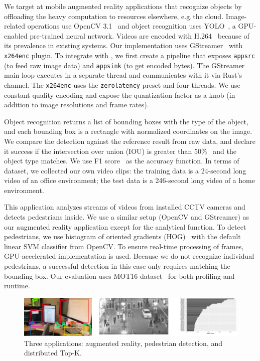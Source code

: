 \documentclass[twocolumn, 9pt]{article}
\begin{document}
 We target at mobile augmented reality applications
that recognize objects by offloading the heavy computation to resources
elsewhere, e.g.\,the cloud.  Image-related operations use OpenCV
3.1~\cite{opencvlibrary} and object recognition uses YOLO~\cite{darknet13,
  redmon2016yolo9000}, a GPU-enabled pre-trained neural network. Videos are
encoded with H.264~\cite{richardson2011h} because of its prevalence in existing
systems. Our implementation uses GStreamer~\cite{gstreamer} with
\texttt{x264enc} plugin. To integrate with \sysname{}, we first create a
pipeline that exposes \texttt{appsrc} (to feed raw image data) and
\texttt{appsink} (to get encoded bytes). The GStreamer main loop executes in a
separate thread and \sysname{} communicates with it via Rust's channel. The
\texttt{x264enc} uses the \texttt{zerolatency} preset and four threads. We use
constant quality encoding and expose the quantization factor as a knob (in
addition to image resolutions and frame rates).

Object recognition returns a list of bounding boxes with the type of the object,
and each bounding box is a rectangle with normalized coordinates on the
image. We compare the detection against the reference result from raw data, and
declare it success if the intersection over union (IOU) is greater than
50\%~\cite{everingham2010pascal} and the object type matches. We use F1
score~\cite{Rijsbergen:1979:IR:539927} as the accuracy function. In terms of
dataset, we collected our own video clips: the training data is a 24-second long
video of an office environment; the test data is a 246-second long video of a
home environment.

 This application analyzes streams of videos from
installed CCTV cameras and detects pedestrians inside. We use a similar setup
(OpenCV and GStreamer) as our augmented reality application except for the
analytical function. To detect pedestrians, we use histogram of oriented
gradients (HOG)~\cite{dalal2005histograms} with the default linear SVM
classifier from OpenCV. To ensure real-time processing of frames,
GPU-accelerated implementation is used. Because we do not recognize individual
pedestrians, a successful detection in this case only requires matching the
bounding box. Our evaluation uses MOT16 dataset~\cite{milan2016mot16} for both
profiling and runtime.

\begin{figure}
  \centering
  \includegraphics[width=\columnwidth]{figures/apps.pdf}
  \caption{Three applications: augmented reality, pedestrian detection, and
    distributed Top-K.}
  \label{fig:three-apps}
\end{figure}
\end{document}
